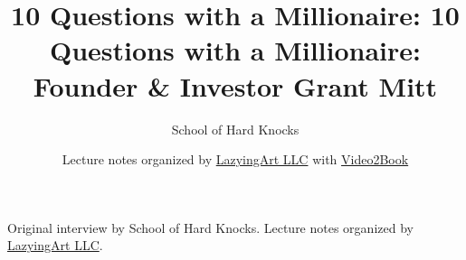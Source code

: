 \documentclass[11pt,oneside]{book}
\begin{document}
\frontmatter
\title{10 Questions with a Millionaire: 10 Questions with a Millionaire: Founder \& Investor Grant Mitt}
\author{School of Hard Knocks}
\date{Lecture notes organized by \href{https://lazying.art}{LazyingArt LLC} with \href{https://github.com/lachlanchen/Video2Book}{Video2Book}}
\maketitle
\begin{center}
\small Original interview by School of Hard Knocks. Lecture notes organized by \href{https://lazying.art}{LazyingArt LLC}.
\end{center}
\clearpage
\mainmatter

\end{document}
